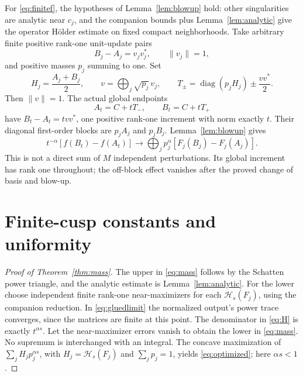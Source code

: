 \documentclass[11pt]{article}
\numberwithin{equation}{section}
\newcommand{\diag}{\operatorname{diag}}
\newcommand{\cH}{\mathcal H}
\begin{document}
For \eqref{eq:finitef}, the hypotheses of Lemma~\ref{lem:blowup} hold:
other singularities are analytic near $c_j$, and the companion bounds
plus Lemma~\ref{lem:analytic} give the operator H\"older estimate on
fixed compact neighborhoods.
Take arbitrary finite positive rank-one unit-update pairs
\[
 B_j-A_j=v_jv_j^*,\qquad \|v_j\|=1,
\]
and positive masses $p_j$ summing to one. Set
\begin{equation}\label{eq:gluing}
 H_j=\frac{A_j+B_j}{2},\qquad
 v=\bigoplus_j\sqrt{p_j}\,v_j,\qquad
 T_\pm=\diag(p_j H_j)\pm\frac{vv^*}{2}.
\end{equation}
Then $\|v\|=1$. The actual global endpoints
\begin{equation}\label{eq:globalpair}
 A_t=C+tT_-,\qquad B_t=C+tT_+
\end{equation}
have $B_t-A_t=t vv^*$, one positive rank-one increment with norm exactly
$t$. Their diagonal first-order blocks are $p_jA_j$ and $p_jB_j$.
Lemma~\ref{lem:blowup} gives
\begin{equation}\label{eq:gluedlimit}
 t^{-\alpha}[f(B_t)-f(A_t)]
 \longrightarrow
 \bigoplus_j p_j^\alpha[F_j(B_j)-F_j(A_j)].
\end{equation}
This is not a direct sum of $M$ independent perturbations. Its global
increment has rank one throughout; the off-block effect vanishes
after the proved change of basis and blow-up.

\section{Finite-cusp constants and uniformity}

\begin{proof}[Proof of Theorem~\ref{thm:mass}]
The upper in \eqref{eq:mass} follows by the Schatten power triangle,
and the analytic estimate is Lemma~\ref{lem:analytic}.
For the lower choose independent finite rank-one near-maximizers
for each $\cH_s(F_j)$, using the companion reduction.
In \eqref{eq:gluedlimit} the normalized output's power trace converges,
since the matrices are finite at this point. The denominator in
\eqref{eq:H} is exactly $t^{\alpha s}$.
Let the near-maximizer errors vanish to obtain the lower in
\eqref{eq:mass}. No supremum is interchanged with an integral.
The concave maximization of $\sum_j H_j p_j^{\alpha s}$,
with $H_j=\cH_s(F_j)$ and $\sum_jp_j=1$, yields
\eqref{eq:optimized}; here $\alpha s<1$.
\end{proof}
\end{document}
